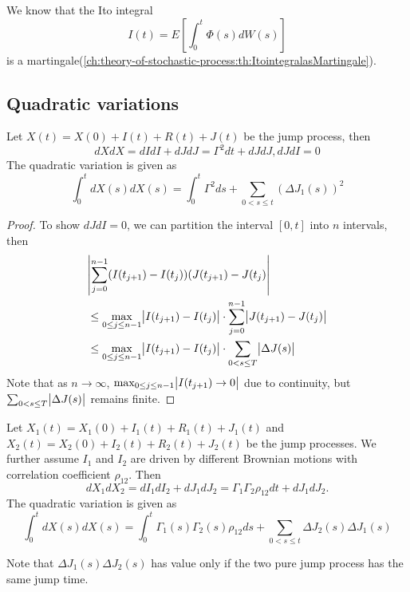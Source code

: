 \begin{refsection}
\begin{remark}
	We know that the Ito integral 
	$$I(t) = E[\int_0^t\Phi(s)dW(s)]$$
	is a martingale(\autoref{ch:theory-of-stochastic-process:th:ItointegralasMartingale}). 
\end{remark}



\subsection{Quadratic variations}
\begin{lemma}\cite[481]{shreve2004stochastic2}
	Let  $X(t) = X(0) + I(t) + R(t) + J(t)$ be the jump process, then
	$$dXdX = dIdI + dJdJ = \Gamma^2dt + dJdJ, dJdI = 0$$
	The quadratic variation is given as
	$$\int_0^t dX(s)dX(s) = \int_0^t\Gamma^2ds + \sum_{0<s\leq t} (\Delta J_1(s))^2$$
\end{lemma}
\begin{proof}
	To show $dJdI = 0$, we can partition the interval $[0,t]$ into $n$ intervals, then 
	\begin{align*}
	&\abs{\sum_{j=0}^{n-1} (I(t_{j+1}) - I(t_j))(J(t_{j+1})-J(t_j)} \\
	&\leq \max_{0\leq j\leq n-1} \abs{I(t_{j+1}) - I(t_j)} \cdot \sum_{j=0}^{n-1} \abs{J(t_{j+1}) - J(t_j)}\\
	&\leq \max_{0\leq j\leq n-1} \abs{I(t_{j+1}) - I(t_j)} \cdot \sum_{0<s\leq T}\abs{\Delta J(s)}
	\end{align*}
	Note that as $n \to \infty$, $\max_{0\leq j\leq n-1} \abs{I(t_{j+1}) \to 0}$ due to continuity, but $\sum_{0<s\leq T}\abs{\Delta J(s)}$ remains finite.
\end{proof}


\begin{lemma}\cite[481]{shreve2004stochastic2}
	Let  $X_1(t) = X_1(0) + I_1(t) + R_1(t) + J_1(t)$ and $X_2(t) = X_2(0) + I_2(t) + R_2(t) + J_2(t)$  be the jump processes. We further assume $I_1$ and $I_2$ are driven by different Brownian motions with correlation coefficient $\rho_{12}$. Then
	$$dX_1dX_2 = dI_1dI_2 + dJ_1dJ_2 = \Gamma_1\Gamma_2\rho_{12}dt + dJ_1dJ_2.$$
	The quadratic variation is given as
	$$\int_0^t dX(s)dX(s) = \int_0^t\Gamma_1(s)\Gamma_2(s)\rho_{12}ds + \sum_{0<s\leq t} \Delta J_2(s)\Delta J_1(s)$$
\end{lemma}


\begin{remark}[interpretation]
	Note that $\Delta J_1(s) \Delta J_2(s)$ has value only if the two pure jump process has the same jump time.
	

\end{remark}
\end{refsection}
